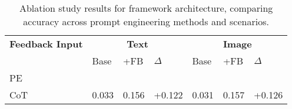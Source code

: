 \begin{table}[!h]
\caption{Ablation study results for framework architecture, comparing accuracy across prompt engineering methods and scenarios.}
\label{tab:feedback_input}
\begin{tabular}{p{1.5cm}|p{0.73cm}p{0.73cm}p{0.73cm}|p{0.73cm}p{0.73cm}p{0.73cm}}
\toprule
\textbf{Feedback Input} & \multicolumn{3}{c|}{\textbf{Text}} & \multicolumn{3}{c}{\textbf{Image}} \\
 & Base & +FB & $\Delta{}$ & Base & +FB & $\Delta{}$ \\
PE &  &  &  &  &  &  \\
\midrule
CoT & 0.033 & 0.156 & +0.122 & 0.031 & 0.157 & +0.126 \\
\bottomrule
\end{tabular}
\end{table}
